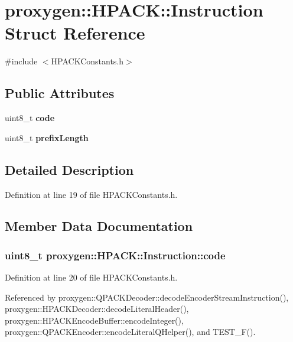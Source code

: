 \section{proxygen\+:\+:H\+P\+A\+CK\+:\+:Instruction Struct Reference}
\label{structproxygen_1_1HPACK_1_1Instruction}


{\ttfamily \#include $<$H\+P\+A\+C\+K\+Constants.\+h$>$}

\subsection*{Public Attributes}
\begin{DoxyCompactItemize}
\item 
uint8\+\_\+t {\bf code}
\item 
uint8\+\_\+t {\bf prefix\+Length}
\end{DoxyCompactItemize}


\subsection{Detailed Description}


Definition at line 19 of file H\+P\+A\+C\+K\+Constants.\+h.



\subsection{Member Data Documentation}
\subsubsection[{code}]{\setlength{\rightskip}{0pt plus 5cm}uint8\+\_\+t proxygen\+::\+H\+P\+A\+C\+K\+::\+Instruction\+::code}\label{structproxygen_1_1HPACK_1_1Instruction_a443ae809682573af34e396f39f79722c}


Definition at line 20 of file H\+P\+A\+C\+K\+Constants.\+h.



Referenced by proxygen\+::\+Q\+P\+A\+C\+K\+Decoder\+::decode\+Encoder\+Stream\+Instruction(), proxygen\+::\+H\+P\+A\+C\+K\+Decoder\+::decode\+Literal\+Header(), proxygen\+::\+H\+P\+A\+C\+K\+Encode\+Buffer\+::encode\+Integer(), proxygen\+::\+Q\+P\+A\+C\+K\+Encoder\+::encode\+Literal\+Q\+Helper(), and T\+E\+S\+T\+\_\+\+F().

